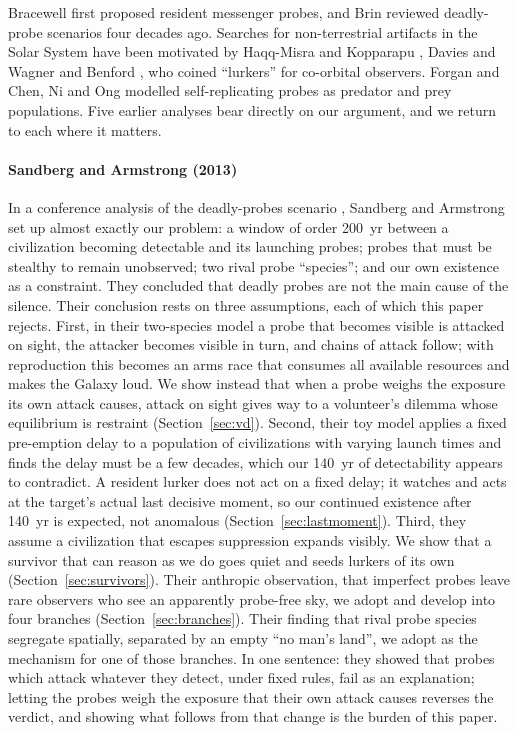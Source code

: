 \documentclass[preprint,12pt]{elsarticle}
\theoremstyle{definition}
\begin{document}
Bracewell \citep{Bracewell1960} first proposed resident messenger probes, and Brin \citep{Brin1983} reviewed deadly-probe scenarios four decades ago. Searches for non-terrestrial artifacts in the Solar System have been motivated by Haqq-Misra and Kopparapu \citep{HaqqMisraKopparapu2012}, Davies and Wagner \citep{DaviesWagner2013} and Benford \citep{Benford2019}, who coined ``lurkers'' for co-orbital observers. Forgan \citep{Forgan2019} and Chen, Ni and Ong \citep{Chen2022} modelled self-replicating probes as predator and prey populations. Five earlier analyses bear directly on our argument, and we return to each where it matters.

\paragraph{Sandberg and Armstrong (2013)}
In a conference analysis of the deadly-probes scenario \citep{SandbergArmstrong2013}, Sandberg and Armstrong set up almost exactly our problem: a window of order 200~yr between a civilization becoming detectable and its launching probes; probes that must be stealthy to remain unobserved; two rival probe ``species''; and our own existence as a constraint. They concluded that deadly probes are not the main cause of the silence. Their conclusion rests on three assumptions, each of which this paper rejects. First, in their two-species model a probe that becomes visible is attacked on sight, the attacker becomes visible in turn, and chains of attack follow; with reproduction this becomes an arms race that consumes all available resources and makes the Galaxy loud. We show instead that when a probe weighs the exposure its own attack causes, attack on sight gives way to a volunteer's dilemma whose equilibrium is restraint (Section~\ref{sec:vd}). Second, their toy model applies a fixed pre-emption delay to a population of civilizations with varying launch times and finds the delay must be a few decades, which our 140~yr of detectability appears to contradict. A resident lurker does not act on a fixed delay; it watches and acts at the target's actual last decisive moment, so our continued existence after 140~yr is expected, not anomalous (Section~\ref{sec:lastmoment}). Third, they assume a civilization that escapes suppression expands visibly. We show that a survivor that can reason as we do goes quiet and seeds lurkers of its own (Section~\ref{sec:survivors}). Their anthropic observation, that imperfect probes leave rare observers who see an apparently probe-free sky, we adopt and develop into four branches (Section~\ref{sec:branches}). Their finding that rival probe species segregate spatially, separated by an empty ``no man's land'', we adopt as the mechanism for one of those branches. In one sentence: they showed that probes which attack whatever they detect, under fixed rules, fail as an explanation; letting the probes weigh the exposure that their own attack causes reverses the verdict, and showing what follows from that change is the burden of this paper.
\end{document}
